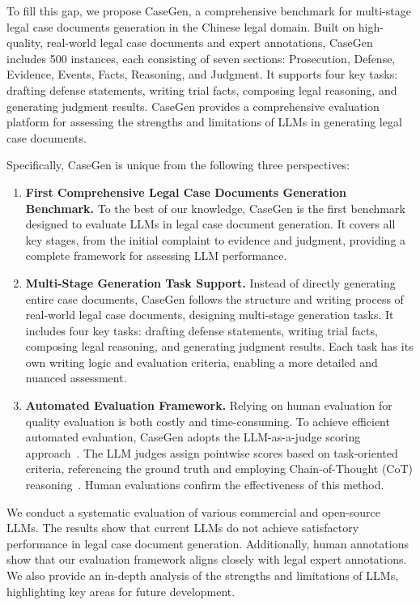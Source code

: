 To fill this gap, we propose CaseGen, a comprehensive benchmark for multi-stage legal case documents generation in the Chinese legal domain.
Built on high-quality, real-world legal case documents and expert annotations, CaseGen includes 500 instances, each consisting of seven sections: Prosecution, Defense, Evidence, Events, Facts, Reasoning, and Judgment. 
It supports four key tasks: drafting defense statements, writing trial facts, composing legal reasoning, and generating judgment results.
CaseGen provides a comprehensive evaluation platform for assessing the strengths and limitations of LLMs in generating legal case documents.

Specifically, CaseGen is unique from the following three perspectives:


\begin{enumerate} 
\item \textbf{First Comprehensive Legal Case Documents Generation Benchmark.}  
To the best of our knowledge, CaseGen is the first benchmark designed to evaluate LLMs in legal case document generation. 
It covers all key stages, from the initial complaint to evidence and judgment, providing a complete framework for assessing LLM performance.


\item \textbf{Multi-Stage Generation Task Support.} 
Instead of directly generating entire case documents, CaseGen follows the structure and writing process of real-world legal case documents, designing multi-stage generation tasks. It includes four key tasks: drafting defense statements, writing trial facts, composing legal reasoning, and generating judgment results. Each task has its own writing logic and evaluation criteria, enabling a more detailed and nuanced assessment.

\item \textbf{Automated Evaluation Framework.}
Relying on human evaluation for quality evaluation is both costly and time-consuming. To achieve efficient automated evaluation, CaseGen adopts the LLM-as-a-judge scoring approach~\cite{li2024llms}. 
The LLM judges assign pointwise scores based on task-oriented criteria, referencing the ground truth and employing Chain-of-Thought (CoT) reasoning~\cite{wei2022chain}. Human evaluations confirm the effectiveness of this method.
\end{enumerate}

We conduct a systematic evaluation of various commercial and open-source LLMs. 
The results show that current LLMs do not achieve satisfactory performance in legal case document generation.
Additionally, human annotations show that our evaluation framework aligns closely with legal expert annotations. We also provide an in-depth analysis of the strengths and limitations of LLMs, highlighting key areas for future development.



